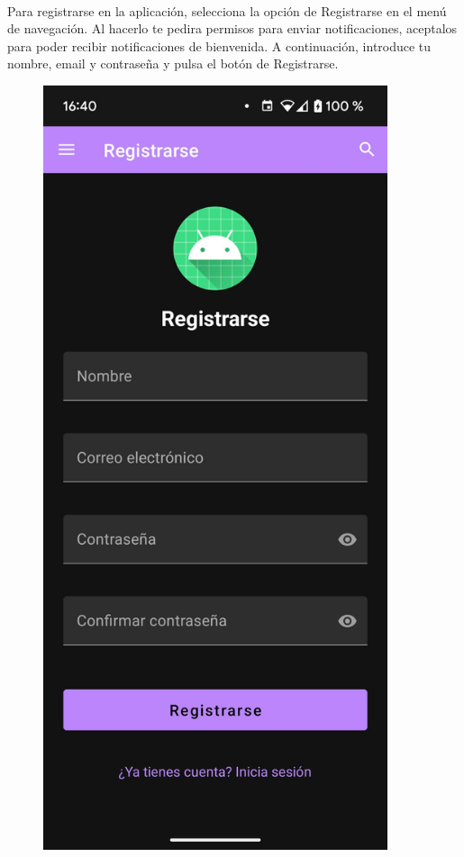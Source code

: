 \documentclass[a4paper,12pt]{report}
\begin{document}
      \begin{minipage}{0.4\textwidth}
        \paragraph*{}{
          Para registrarse en la aplicación, selecciona la opción de Registrarse en el menú de navegación. Al hacerlo te pedira permisos para enviar notificaciones, aceptalos para poder recibir notificaciones de bienvenida. A continuación, introduce tu nombre, email y contraseña y pulsa el botón de Registrarse.
        }
      \end{minipage}
      \hfill
      \begin{minipage}{0.25\textwidth}
        \begin{figure}[H]
          \centering
          \includegraphics[width=0.9\textwidth]{.img/registro.png}

\end{figure}
\end{minipage}
\end{document}
